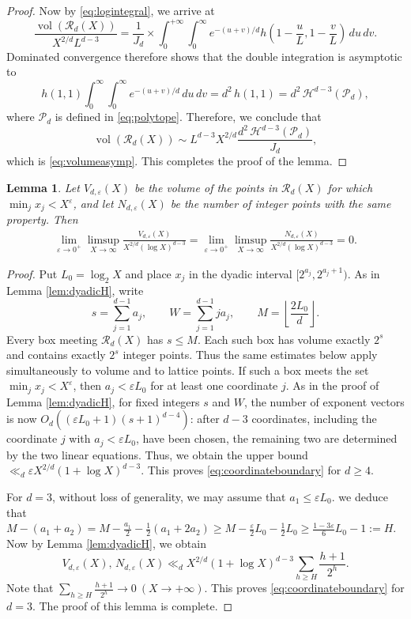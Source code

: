\documentclass[12pt,a4paper,reqno]{amsart}
\numberwithin{equation}{section}
\newcommand{\cH}{\mathcal H}
\newcommand{\cP}{\mathcal P}
\newcommand{\cR}{\mathcal R}
\newcommand{\1}{\mathbf 1}
\newcommand{\eps}{\varepsilon}
\DeclareMathOperator{\vol}{vol}
\theoremstyle{plain}
\newtheorem{lemma}[theorem]{Lemma}
\theoremstyle{definition}
\begin{document}
\begin{proof}
Now by \eqref{eq:logintegral}, we arrive at
$$\frac{\vol(\cR_d(X))}{ X^{2/d}L^{d-3}}=\frac{1}{J_d}\times \int_0^{ +\infty}\!\int_0^{ \infty}
 e^{-(u+v)/d}
 h\left(1-\frac{u}{L},1-\frac{v}{L}\right)\,du\,dv.$$
Dominated
convergence therefore shows that the double integration is asymptotic to
\[
h(1,1)
 \int_0^\infty\!\int_0^\infty e^{-(u+v)/d}\,du\,dv
 =d^2\,h(1,1)=d^2\, \cH^{d-3}(\cP_d),
\]
where $\cP_d$ is defined in \eqref{eq:polytope}.
Therefore, we conclude that
\[
 \vol(\cR_d(X))
 \sim
 L^{d-3}X^{2/d}\frac{d^2\,\cH^{d-3}(\cP_d)}{J_d},
\]
which is \eqref{eq:volumeasymp}. This completes the proof of the lemma.
\end{proof}

\begin{lemma}\label{lem:coordinateboundary}
Let $V_{d,\eps}(X)$ be the volume of the points in $\cR_d(X)$ for
which $\min_jx_j<X^\eps$, and let $N_{d,\eps}(X)$ be the number of
integer points with the same property.  Then
\begin{align}
 \lim_{\eps\rightarrow 0^{+}}\limsup_{X\to\infty}
 \frac{V_{d,\eps}(X)}{X^{2/d}(\log X)^{d-3}}
 =
 \lim_{\eps\rightarrow 0^{+}}\limsup_{X\to\infty}
 \frac{N_{d,\eps}(X)}
 {X^{2/d}(\log X)^{d-3}}=0.
 \label{eq:coordinateboundary}
\end{align}
\end{lemma}

\begin{proof}
Put $L_0=\log_2X$ and place $x_j$ in the dyadic interval
$[2^{a_j},2^{a_j+1})$.  As in Lemma \ref{lem:dyadicH}, write
\[
 s=\sum_{j=1}^{d-1}a_j, \qquad W=\sum_{j=1}^{d-1} ja_j, 
 \qquad M=\left\lfloor\frac{2L_0}{d}\right\rfloor.
\]
Every box meeting $\cR_d(X)$ has $s\leq M$.  Each such box
has volume exactly $2^s$ and contains exactly $2^s$ integer points.
Thus the same estimates below apply simultaneously to volume and to
lattice points.  If such a box meets the set
$\min_jx_j<X^\eps$, then $a_j<\eps L_0$ for at least one coordinate
$j$. As in the proof of Lemma \ref{lem:dyadicH}, for fixed integers $s$ and $W$, the number of exponent vectors is
now $O_d((\eps L_0+1)(s+1)^{d-4})$: after $d-3$ coordinates, including the coordinate $j$ with $a_j<\eps L_0$,  have been chosen, the
remaining two are determined by the two linear equations. Thus, we obtain the upper bound $\ll_d \eps X^{2/d}(1+\log X)^{d-3}$. This proves \eqref{eq:coordinateboundary} for $d\geq 4$.

For $d=3$, without loss of generality, we may assume that $a_1\leq \eps L_0$. we deduce that 
$M-(a_1+a_2)=M-\frac{a_1}{2}-\frac{1}{2}(a_1+2a_2)\geq M-\frac{\eps}{2}L_0-\frac{1}{2}L_0\geq \frac{1-3\eps}{6}L_0-1:=H$. Now by Lemma \ref{lem:dyadicH}, we obtain
$$V_{d,\eps}(X),\, N_{d,\eps}(X)\ll _d X^{2/d}(1+\log X)^{d-3}\sum_{h\geq H}\frac{h+1}{2^h}.$$
Note that $\sum_{h\geq H}\frac{h+1}{2^h}\rightarrow 0~(X\rightarrow +\infty)$. This proves \eqref{eq:coordinateboundary} for $d=3$. The proof of this lemma is complete.


\end{proof}
\end{document}
